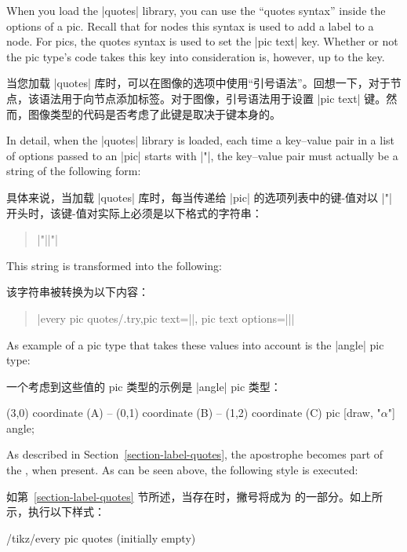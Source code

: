 When you load the |quotes| library, you can use the ``quotes syntax'' inside
the options of a pic. Recall that for nodes this syntax is used to add a label
to a node. For pics, the quotes syntax is used to set the |pic text| key.
Whether or not the pic type's code takes this key into consideration is,
however, up to the key.

当您加载 |quotes| 库时，可以在图像的选项中使用“引号语法”。回想一下，对于节点，该语法用于向节点添加标签。对于图像，引号语法用于设置 |pic text| 键。然而，图像类型的代码是否考虑了此键是取决于键本身的。

In detail, when the |quotes| library is loaded, each time a key--value pair in
a list of options passed to an |pic| starts with |"|, the key--value pair must
actually be a string of the following form:

具体来说，当加载 |quotes| 库时，每当传递给 |pic| 的选项列表中的键-值对以 |"| 开头时，该键-值对实际上必须是以下格式的字符串：

%
\begin{quote}
    |"||"|
\end{quote}
%
This string is transformed into the following:

该字符串被转换为以下内容：
\begin{quote}
    |every pic quotes/.try,pic text=||, pic text options={||}|
\end{quote}

As example of a pic type that takes these values into account is the |angle|
pic type:

一个考虑到这些值的 pic 类型的示例是 |angle| pic 类型：

%
\begin{codeexample}[preamble={\usetikzlibrary{angles,quotes}}]
\tikz \draw (3,0) coordinate (A)
         -- (0,1) coordinate (B)
         -- (1,2) coordinate (C)
            pic [draw, "$\alpha$"] {angle};
\end{codeexample}

As described in Section~\ref{section-label-quotes}, the apostrophe becomes part
of the , when present. As can be seen above, the following style
is executed:

如第~\ref{section-label-quotes} 节所述，当存在时，撇号将成为  的一部分。如上所示，执行以下样式：
\begin{stylekey}{/tikz/every pic quotes (initially \normalfont empty)}
\end{stylekey}


